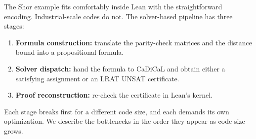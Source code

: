 %
%
%

The Shor example fits comfortably inside Lean with the straightforward encoding.
Industrial-scale codes do not. The solver-based pipeline has three stages:
\begin{enumerate}[leftmargin=1.5em]
    \item \textbf{Formula construction:} translate the parity-check matrices and
    the distance bound into a propositional formula.
    \item \textbf{Solver dispatch:} hand the formula to CaDiCaL and obtain
    either a satisfying assignment or an LRAT UNSAT certificate.
    \item \textbf{Proof reconstruction:} re-check the certificate in Lean's
    kernel.
\end{enumerate}
Each stage breaks first for a different code size, and each demands its own
optimization. We describe the bottlenecks in the order they appear as code size
grows.

